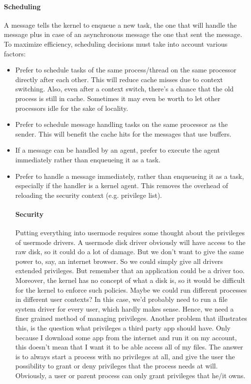 \documentclass[a4paper]{article}
\begin{document}
\paragraph{Scheduling} A message tells the kernel to enqueue a new task, the one that will handle the message plus in case of an asynchronous message the one that sent the message. To maximize efficiency, scheduling decisions must take into account various factors:

\begin{itemize}
  \item Prefer to schedule tasks of the same process/thread on the same processor directly after each other. This will reduce cache misses due to context switching. Also, even after a context switch, there's a chance that the old process is still in cache. Sometimes it may even be worth to let other processors idle for the sake of locality.
  \item Prefer to schedule message handling tasks on the same processor as the sender. This will benefit the cache hits for the messages that use buffers.
  \item If a message can be handled by an agent, prefer to execute the agent immediately rather than enqueueing it as a task.
  \item Prefer to handle a message immediately, rather than enqueueing it as a task, especially if the handler is a kernel agent. This removes the overhead of reloading the security context (e.g. privilege list).
\begin{itemize}


\paragraph{Security} Putting everything into usermode requires some thought about the privileges of usermode drivers. A usermode disk driver obviously will have access to the raw disk, so it could do a lot of damage. But we don't want to give the same power to, say, an internet browser. So we could simply give all drivers extended privileges. But remember that an application could be a driver too. Moreover, the kernel has no concept of what a disk is, so it would be difficult for the kernel to enforce such policies. Maybe we could run different processes in different user contexts? In this case, we'd probably need to run a file system driver for every user, which hardly makes sense. Hence, we need a finer grained method of managing privileges. Another problem that illustrates this, is the question what privileges a third party app should have. Only because I download some app from the internet and run it on my account, this doesn't mean that I want it to be able access all of my files. The answer is to always start a process with no privileges at all, and give the user the possibility to grant or deny privileges that the process needs at will. Obviously, a user or parent process can only grant privileges that he/it owns.



\end{itemize}
\end{itemize}
\end{document}
